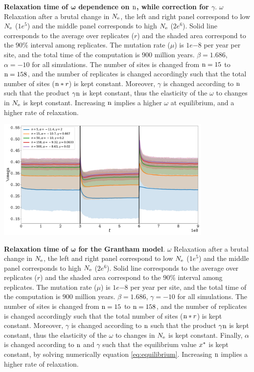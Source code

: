 \documentclass{article}
\begin{document}
\textbf{Relaxation time of $\bm{\omega}$ dependence on $\text{n}$, while correction for $\gamma$}.
$\omega$ Relaxation after a brutal change in $N_{\mathrm{e}}$, the left and right panel correspond to low $N_{\mathrm{e}}$ ($1e^{5}$) and the middle panel corresponds to high $N_{\mathrm{e}}$ ($2e^{6}$). 
Solid line corresponds to the average over replicates ($r$) and the shaded area correspond to the $90\%$ interval among replicates. 
The mutation rate ($\mu$) is $1e{-8}$ per year per site, and the total time of the computation is $900$ million years.
$\beta=1.686$, $\alpha=-10$ for all simulations. The number of sites is changed from $\text{n}=15$ to $\text{n}=158$, and the number of replicates is changed accordingly such that the total number of sites ($\text{n}*r$) is kept constant.
Moreover, $\gamma$ is changed according to $\text{n}$ such that the product $\gamma\text{n}$ is kept constant, thus the  elasticity of the $\omega$ to changes in $N_{\mathrm{e}}$ is kept constant.
Increasing $\text{n}$ implies a higher $\omega$ at equilibrium, and a higher rate of relaxation.
\begin{center}
 \includegraphics[width=0.8\textwidth] {artworks/Relaxation-Stability-Grantham-Alpha-Gamma.pdf}
\end{center}
\textbf{Relaxation time of $\bm{\omega}$ for the Grantham model}.
$\omega$ Relaxation after a brutal change in $N_{\mathrm{e}}$, the left and right panel correspond to low $N_{\mathrm{e}}$ ($1e^{5}$) and the middle panel corresponds to high $N_{\mathrm{e}}$ ($2e^{6}$). 
Solid line corresponds to the average over replicates ($r$) and the shaded area correspond to the $90\%$ interval among replicates. 
The mutation rate ($\mu$) is $1e{-8}$ per year per site, and the total time of the computation is $900$ million years.
$\beta=1.686$, $\gamma=-10$ for all simulations. The number of sites is changed from $\text{n}=15$ to $\text{n}=158$, and the number of replicates is changed accordingly such that the total number of sites ($\text{n}*r$) is kept constant.
Moreover, $\gamma$ is changed according to $\text{n}$ such that the product $\gamma\text{n}$ is kept constant, thus the  elasticity of the $\omega$ to changes in $N_{\mathrm{e}}$ is kept constant.
Finally, $\alpha$ is changed according to $\text{n}$ and $\gamma$ such that the equilibrium value $x^{*}$ is kept constant, by solving numerically equation \ref{eq:equilibrium}.
Increasing $\text{n}$ implies a higher rate of relaxation.
\end{document}
